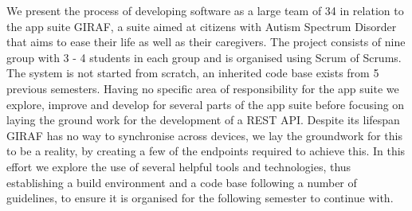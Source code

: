 We present the process of developing software as a large team of 34 in relation to the app suite GIRAF, a suite aimed at citizens with Autism Spectrum Disorder that aims to ease their life as well as their caregivers.
The project consists of nine group with 3 - 4 students in each group and is organised using Scrum of Scrums.
The system is not started from scratch, an inherited code base exists from 5 previous semesters.
Having no specific area of responsibility for the app suite we explore, improve and develop for several parts of the app suite before focusing on laying the ground work for the development of a REST API.
Despite its lifespan GIRAF has no way to synchronise across devices, we lay the groundwork for this to be a reality, by creating a few of the endpoints required to achieve this.
In this effort we explore the use of several helpful tools and technologies, thus establishing a build environment and a code base following a number of guidelines, to ensure it is organised for the following semester to continue with.